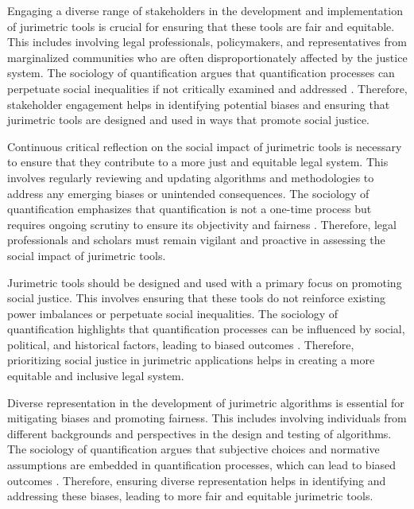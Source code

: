 Engaging a diverse range of stakeholders in the development and implementation of jurimetric tools is crucial for ensuring that these tools are fair and equitable. This includes involving legal professionals, policymakers, and representatives from marginalized communities who are often disproportionately affected by the justice system. The sociology of quantification argues that quantification processes can perpetuate social inequalities if not critically examined and addressed \cite{10.1007/s11186-021-09453-1,1023071190721}. Therefore, stakeholder engagement helps in identifying potential biases and ensuring that jurimetric tools are designed and used in ways that promote social justice.

Continuous critical reflection on the social impact of jurimetric tools is necessary to ensure that they contribute to a more just and equitable legal system. This involves regularly reviewing and updating algorithms and methodologies to address any emerging biases or unintended consequences. The sociology of quantification emphasizes that quantification is not a one-time process but requires ongoing scrutiny to ensure its objectivity and fairness \cite{10.1007/s11186-021-09453-1,1023071190721}. Therefore, legal professionals and scholars must remain vigilant and proactive in assessing the social impact of jurimetric tools.

Jurimetric tools should be designed and used with a primary focus on promoting social justice. This involves ensuring that these tools do not reinforce existing power imbalances or perpetuate social inequalities. The sociology of quantification highlights that quantification processes can be influenced by social, political, and historical factors, leading to biased outcomes \cite{10.1007/s11186-021-09453-1,1023071190721}. Therefore, prioritizing social justice in jurimetric applications helps in creating a more equitable and inclusive legal system.

Diverse representation in the development of jurimetric algorithms is essential for mitigating biases and promoting fairness. This includes involving individuals from different backgrounds and perspectives in the design and testing of algorithms. The sociology of quantification argues that subjective choices and normative assumptions are embedded in quantification processes, which can lead to biased outcomes \cite{10.1007/s11186-021-09453-1,1023071190721}. Therefore, ensuring diverse representation helps in identifying and addressing these biases, leading to more fair and equitable jurimetric tools.

